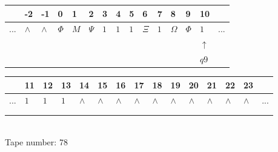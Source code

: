 \documentclass[11pt]{article}
\begin{document}
\begin{table}[H]
\centering
\begin{tabular}{lllllllllllllll}
 & -2 & -1 & 0 & 1 & 2 & 3 & 4 & 5 & 6 & 7 & 8 & 9 & 10 & \\
\hline
$...$ & \multicolumn{1}{|l|}{$\wedge$} & \multicolumn{1}{|l|}{$\wedge$} & \multicolumn{1}{|l|}{$\Phi$} & \multicolumn{1}{|l|}{$M$} & \multicolumn{1}{|l|}{$\Psi$} & \multicolumn{1}{|l|}{$1$} & \multicolumn{1}{|l|}{$1$} & \multicolumn{1}{|l|}{$1$} & \multicolumn{1}{|l|}{$\Xi$} & \multicolumn{1}{|l|}{$1$} & \multicolumn{1}{|l|}{$\Omega$} & \multicolumn{1}{|l|}{$\Phi$} & \multicolumn{1}{|l|}{$1$} & $...$\\
\hline
&  &  &  &  &  &  &  &  &  &  &  &  & $\uparrow$ &  \\
&  &  &  &  &  &  &  &  &  &  &  &  & $ q9 $ &  \\
\end{tabular}
\begin{tabular}{lllllllllllllll}
 & 11 & 12 & 13 & 14 & 15 & 16 & 17 & 18 & 19 & 20 & 21 & 22 & 23 & \\
\hline
$...$ & \multicolumn{1}{|l|}{$1$} & \multicolumn{1}{|l|}{$1$} & \multicolumn{1}{|l|}{$1$} & \multicolumn{1}{|l|}{$\wedge$} & \multicolumn{1}{|l|}{$\wedge$} & \multicolumn{1}{|l|}{$\wedge$} & \multicolumn{1}{|l|}{$\wedge$} & \multicolumn{1}{|l|}{$\wedge$} & \multicolumn{1}{|l|}{$\wedge$} & \multicolumn{1}{|l|}{$\wedge$} & \multicolumn{1}{|l|}{$\wedge$} & \multicolumn{1}{|l|}{$\wedge$} & \multicolumn{1}{|l|}{$\wedge$} & $...$\\
\hline
&  &  &  &  &  &  &  &  &  &  &  &  &  &  \\
&  &  &  &  &  &  &  &  &  &  &  &  &  &  \\
\end{tabular}
\\
Tape number: 78
\noindent\makebox[\linewidth]{\hdashrule{\textwidth}{1pt}{1pt}}\end{table}
\end{document}

